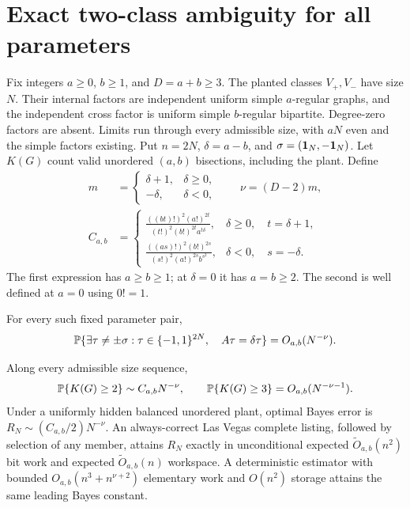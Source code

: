 \section{Exact two-class ambiguity for all parameters}\label{sec:sharp-ambiguity}
\label{sec:rigidity}
Fix integers $a\ge0$, $b\ge1$, and $D=a+b\ge3$. The planted classes
$V_+,V_-$ have size $N$. Their internal factors are independent uniform
simple $a$-regular graphs, and the independent cross factor is uniform
simple $b$-regular bipartite. Degree-zero factors are absent. Limits
run through every admissible size, with $aN$ even and the simple factors
existing. Put $n=2N$, $\delta=a-b$, and
$\sigma=(\mathbf 1_N,-\mathbf 1_N)$. Let $K(G)$ count valid unordered
$(a,b)$ bisections, including the plant. Define
\begin{equation}\label{eq:ambiguity-exponent}
 \begin{split}
 m&=\begin{cases}\delta+1,&\delta\ge0,\\-\delta,&\delta<0,\end{cases}
 \qquad \nu=(D-2)m,\\
 C_{a,b}&=\begin{cases}
 \displaystyle\frac{((bt)!)^2(a!)^{2t}}
 {(t!)^2(b!)^{2t}a^{t\delta}},&\delta\ge0,\quad t=\delta+1,\\[6pt]
 \displaystyle\frac{((as)!)^2(b!)^{2s}}
 {(s!)^2(a!)^{2s}b^{s^2}},&\delta<0,\quad s=-\delta.
 \end{cases}
 \end{split}
\end{equation}
The first expression has $a\ge b\ge1$; at $\delta=0$ it has $a=b\ge2$.
The second is well defined at $a=0$ using $0!=1$.

\begin{theorem}\label{thm:boolean}
For every such fixed parameter pair,
\begin{equation}\label{eq:boolean-rate}
 \mathbb P\{\exists\tau\ne\pm\sigma:\tau\in\{-1,1\}^{2N},\quad
                         A\tau=\delta\tau\}=O_{a,b}(N^{-\nu}).
\end{equation}
\end{theorem}

\begin{theorem}\label{thm:sharp-ambiguity}
Along every admissible size sequence,
\begin{equation}\label{eq:sharp-ambiguity}
 \mathbb P\{K(G)\ge2\}\sim C_{a,b}N^{-\nu},\qquad
 \mathbb P\{K(G)\ge3\}=O_{a,b}(N^{-\nu-1}).
\end{equation}
Under a uniformly hidden balanced unordered plant, optimal Bayes error
is $R_N\sim(C_{a,b}/2)N^{-\nu}$. An always-correct Las Vegas complete
listing, followed by selection of any member, attains $R_N$ exactly
in unconditional expected $\widetilde O_{a,b}(n^2)$ bit work and
expected $\widetilde O_{a,b}(n)$ workspace. A deterministic estimator
with bounded $O_{a,b}(n^3+n^{\nu+2})$ elementary work and $O(n^2)$
storage attains the same leading Bayes constant.
\end{theorem}

